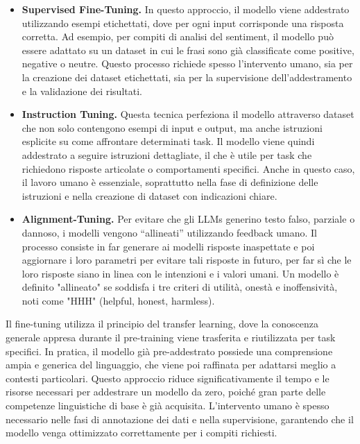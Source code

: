 \documentclass[target=mst,aauheader=,style=]{thud}
\begin{document}
\begin{itemize}
    \item \textbf{Supervised Fine-Tuning.} In questo approccio, il modello viene addestrato utilizzando esempi etichettati, dove per ogni input corrisponde una risposta corretta. Ad esempio, per compiti di analisi del sentiment, il modello può essere adattato su un dataset in cui le frasi sono già classificate come positive, negative o neutre. Questo processo richiede spesso l’intervento umano, sia per la creazione dei dataset etichettati, sia per la supervisione dell'addestramento e la validazione dei risultati.
    \item \textbf{Instruction Tuning.} Questa tecnica perfeziona il modello attraverso dataset che non solo contengono esempi di input e output, ma anche istruzioni esplicite su come affrontare determinati task. Il modello viene quindi addestrato a seguire istruzioni dettagliate, il che è utile per task che richiedono risposte articolate o comportamenti specifici. Anche in questo caso, il lavoro umano è essenziale, soprattutto nella fase di definizione delle istruzioni e nella creazione di dataset con indicazioni chiare.
    \item \textbf{Alignment-Tuning.} Per evitare che gli LLMs generino testo falso, parziale o dannoso, i modelli vengono “allineati” utilizzando feedback umano. Il processo consiste in far generare ai modelli risposte inaspettate e poi aggiornare i loro parametri per evitare tali risposte in futuro, per far sì che le loro risposte siano in linea con le intenzioni e i valori umani. Un modello è definito "allineato" se soddisfa i tre criteri di utilità, onestà e inoffensività, noti come "HHH" (helpful, honest, harmless).
\end{itemize}

Il fine-tuning utilizza il principio del transfer learning, dove la conoscenza generale appresa durante il pre-training viene trasferita e riutilizzata per task specifici. In pratica, il modello già pre-addestrato possiede una comprensione ampia e generica del linguaggio, che viene poi raffinata per adattarsi meglio a contesti particolari. Questo approccio riduce significativamente il tempo e le risorse necessari per addestrare un modello da zero, poiché gran parte delle competenze linguistiche di base è già acquisita. L'intervento umano è spesso necessario nelle fasi di annotazione dei dati e nella supervisione, garantendo che il modello venga ottimizzato correttamente per i compiti richiesti.\cite{zhao_2023}
\end{document}
